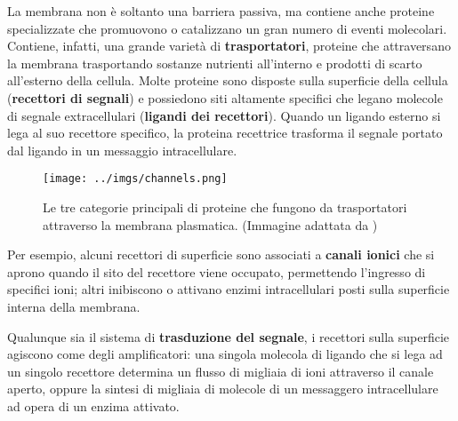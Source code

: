 La membrana non è soltanto una barriera passiva, ma contiene anche proteine specializzate che promuovono o catalizzano un gran numero di eventi molecolari.
%
Contiene, infatti, una grande varietà di \textbf{trasportatori}, proteine che attraversano la membrana trasportando sostanze nutrienti all'interno e prodotti di scarto all'esterno della cellula. 
Molte proteine sono disposte sulla superficie della cellula (\textbf{recettori di segnali}) e possiedono siti altamente specifici che legano molecole di segnale extracellulari (\textbf{ligandi dei recettori}). 
Quando un ligando esterno si lega al suo recettore specifico, la proteina recettrice trasforma il segnale portato dal ligando in un messaggio intracellulare. 

\begin{figure}[h]
\begin{center}
\texttt{[image: ../imgs/channels.png]}
\caption[I canali trans-membrana]{Le tre categorie principali di proteine che fungono da trasportatori attraverso la membrana plasmatica. (Immagine adattata da \cite{nelsonprincipi})}
\label{Fig:channels}
\end{center}
\end{figure}

Per esempio, alcuni recettori di superficie sono associati a \textbf{canali ionici}  che si aprono quando il sito del recettore viene occupato, permettendo l'ingresso di specifici ioni; altri inibiscono o attivano enzimi intracellulari posti sulla superficie interna della membrana.

Qualunque sia il sistema di \textbf{trasduzione del segnale}, i recettori sulla superficie agiscono come degli amplificatori: una singola molecola di ligando che si lega ad un singolo recettore determina un flusso di migliaia di ioni attraverso il canale aperto, oppure la sintesi di migliaia di molecole di un messaggero intracellulare ad opera di un enzima attivato.

